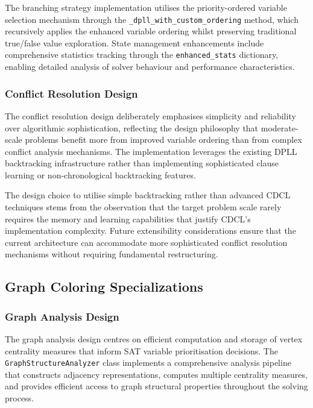 The branching strategy implementation utilises the priority-ordered variable selection mechanism through the \texttt{\_dpll\_with\_custom\_ordering} method, which recursively applies the enhanced variable ordering whilst preserving traditional true/false value exploration. State management enhancements include comprehensive statistics tracking through the \texttt{enhanced\_stats} dictionary, enabling detailed analysis of solver behaviour and performance characteristics.

\subsubsection{Conflict Resolution Design}

The conflict resolution design deliberately emphasises simplicity and reliability over algorithmic sophistication, reflecting the design philosophy that moderate-scale problems benefit more from improved variable ordering than from complex conflict analysis mechanisms. The implementation leverages the existing DPLL backtracking infrastructure rather than implementing sophisticated clause learning or non-chronological backtracking features.

The design choice to utilise simple backtracking rather than advanced CDCL techniques stems from the observation that the target problem scale rarely requires the memory and learning capabilities that justify CDCL's implementation complexity. Future extensibility considerations ensure that the current architecture can accommodate more sophisticated conflict resolution mechanisms without requiring fundamental restructuring.

\subsection{Graph Coloring Specializations}

\subsubsection{Graph Analysis Design}

The graph analysis design centres on efficient computation and storage of vertex centrality measures that inform SAT variable prioritisation decisions. The \texttt{GraphStructure\-Analyzer} class implements a comprehensive analysis pipeline that constructs adjacency representations, computes multiple centrality measures, and provides efficient access to graph structural properties throughout the solving process.

